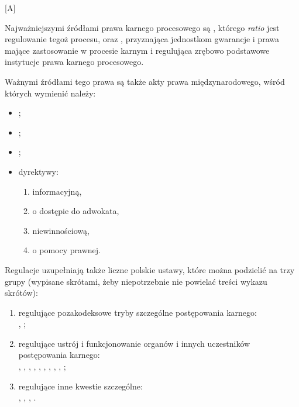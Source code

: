 \setcounter{zagc}{3}[{\kolor A}]

Najważniejszymi źródłami prawa karnego procesowego są , którego \textit{ratio} jest regulowanie tegoż procesu, oraz , przyznająca jednostkom gwarancje i prawa mające zastosowanie w procesie karnym i regulująca zrębowo podstawowe instytucje prawa karnego procesowego.\medskip

Ważnymi źródłami tego prawa są także akty prawa międzynarodowego, wśród których wymienić należy:\begin{itemize}
    \item {};
    \item {};
    \item {};
    \item dyrektywy:\begin{enumerate}
        \item informacyjną,
        \item o dostępie do adwokata,
        \item niewinnościową,
        \item o pomocy prawnej.
    \end{enumerate}
\end{itemize}

Regulacje  uzupełniają także liczne polskie ustawy, które można podzielić na trzy grupy (wypisane skrótami, żeby niepotrzebnie nie powielać treści wykazu skrótów):\begin{enumerate}
    \item regulujące pozakodeksowe tryby szczególne postępowania karnego:\\ , ;
    \item regulujące ustrój i funkcjonowanie organów i innych uczestników postępowania karnego:\\ , , , , , , , , , ;
    \item regulujące inne kwestie szczególne:\\ , , , .
    
\end{enumerate} 